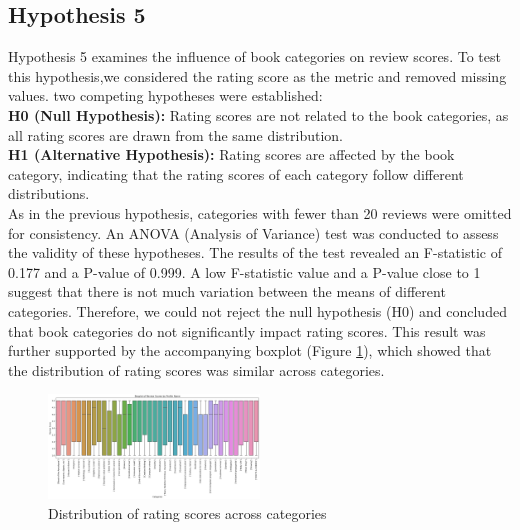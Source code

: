\subsection*{Hypothesis 5}

Hypothesis 5 examines the influence of book categories on review scores.
To test this hypothesis,we considered the rating score as the metric and removed missing values.
two competing hypotheses were established:\\
\textbf{H0 (Null Hypothesis):} Rating scores are not related to the book categories,
as all rating scores are drawn from the same distribution.\\
\textbf{H1 (Alternative Hypothesis):} Rating scores are affected by the book category,
indicating that the rating scores of each category follow different distributions.\\
As in the previous hypothesis, categories with fewer than 20 reviews were omitted for consistency.
An ANOVA (Analysis of Variance) test was conducted to assess the validity of these hypotheses.
The results of the test revealed an F-statistic of 0.177 and a P-value of 0.999.
A low F-statistic value and a P-value close to 1 suggest that there is not much variation
between the means of different categories.
Therefore, we could not reject the null hypothesis (H0) and concluded that book categories
do not significantly impact rating scores.
This result was further supported by the accompanying boxplot (Figure \ref{fig:h5}),
which showed that the distribution of rating scores was similar across categories.
\begin{figure}[H]
    \centering
    \includegraphics[width=0.5\textwidth]{./figures/h5.png}
    \caption{Distribution of rating scores across categories}
    \label{fig:h5}
\end{figure}
